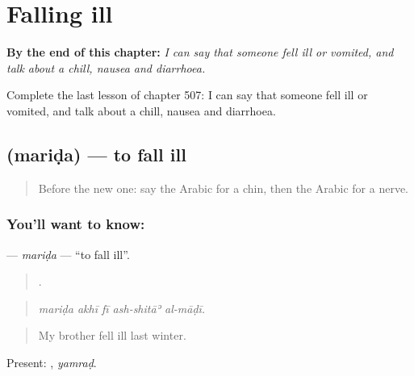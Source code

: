 
\chapter{Falling ill}
\label{ch:ar-falling-ill}

\begin{chapteropening}
\textbf{By the end of this chapter:} \emph{I can say that someone fell ill or vomited, and talk about a chill, nausea and diarrhoea.}

Complete the last lesson of chapter 507: I can say that someone fell ill or vomited, and talk about a chill, nausea and diarrhoea.
\end{chapteropening}

\section[\texorpdfstring{\ar{مرض} (mariḍa)}{مرض (mariḍa)}]{ (mariḍa) — to fall ill}

\label{lesson:AR-C507-marida}



\begin{quote}
Before the new one: say the Arabic for a chin, then the Arabic for a nerve.
\end{quote}

\subsection*{You'll want to know: }
\textbf{} — \emph{mariḍa} — \textquotedblleft{}to fall ill\textquotedblright{}.

\begin{quote}
    .
\end{quote}

\begin{quote}
\emph{mariḍa akhī fī ash-shitāʾ al-māḍī.}
\end{quote}

\begin{quote}
My brother fell ill last winter.
\end{quote}

Present: , \emph{yamraḍ}.

